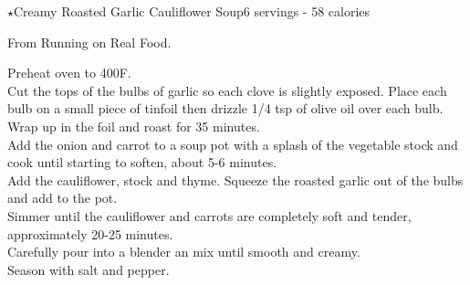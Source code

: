 \begin{recipe}{\texorpdfstring{$\star$}{str}Creamy Roasted Garlic Cauliflower Soup}{6 servings - 58 calories}{}

\freeform From Running on Real Food.


Preheat oven to 400\degree F.\\

Cut the tops of the bulbs of garlic so each clove is slightly exposed. Place each bulb on a small piece of tinfoil then drizzle 1/4 tsp of olive oil over each bulb. Wrap up in the foil and roast for 35 minutes.\\

Add the onion and carrot to a soup pot with a splash of the vegetable stock and cook until starting to soften, about 5-6 minutes.\\

Add the cauliflower, stock and thyme. Squeeze the roasted garlic out of the bulbs and add to the pot.\\

Simmer until the cauliflower and carrots are completely soft and tender, approximately 20-25 minutes.\\

Carefully pour into a blender an mix until smooth and creamy.\\

Season with salt and pepper.

\end{recipe}